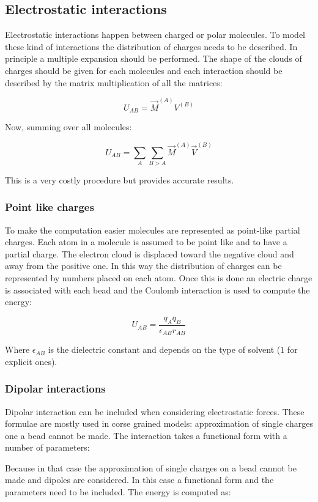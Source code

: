	\subsection{Electrostatic interactions}
	Electrostatic interactions happen between charged or polar molecules.
	To model these kind of interactions the distribution of charges needs to be described.
	In principle a multiple expansion should be performed.
	The shape of the clouds of charges should be given for each molecules and each interaction should be described by the matrix multiplication of all the matrices:

	$$U_{AB} = \vec{M}^{(A)}V^{(B)}$$

	Now, summing over all molecules:

	$$U_{AB} = \sum\limits_{A}\sum\limits_{B>A}\vec{M}^{(A)}\vec{V}^{(B)}$$

	This is a very costly procedure but provides accurate results.

		\subsubsection{Point like charges}
		To make the computation easier molecules are represented as point-like partial charges.
		Each atom in a molecule is assumed to be point like and to have a partial charge.
		The electron cloud is displaced toward the negative cloud and away from the positive one.
		In this way the distribution of charges can be represented by numbers placed on each atom.
		Once this is done an electric charge is associated with each bead and the Coulomb interaction is used to compute the energy:

		$$U_{AB} = \frac{q_Aq_B}{\epsilon_{AB}r_{AB}}$$

		Where $\epsilon_{AB}$ is the dielectric constant and depends on the type of solvent ($1$ for explicit ones).

		\subsubsection{Dipolar interactions}
		Dipolar interaction can be included when considering electrostatic forces.
		These formulae are mostly used in corse grained models: approximation of single charges one a bead cannot be made.
		The interaction takes a functional form with a number of parameters:

		Because in that case the approximation of single charges on a bead cannot be made and dipoles are considered.
		In this case a functional form and the parameters need to be included.
		The energy is computed as:


